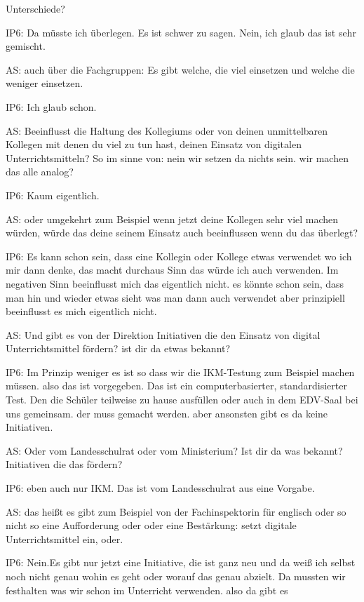 \documentclass[fontsize=11pt,paper=a4]{scrbook}
\begin{document}
{\begin{itemize*}
Unterschiede?
\item[IP6:] Da müsste ich überlegen. Es ist schwer zu sagen. Nein, ich glaub das ist sehr gemischt.
\item[AS:] auch über die Fachgruppen: Es gibt welche, die viel einsetzen und welche die weniger einsetzen.
\item[IP6:] Ich glaub schon.
\item[AS:] Beeinflusst die Haltung des Kollegiums
oder von deinen unmittelbaren Kollegen
mit denen du viel zu tun hast, deinen
Einsatz von digitalen Unterrichtsmitteln? So im sinne
von: nein wir setzen da nichts sein. wir
machen das alle analog?
\item[IP6:] Kaum eigentlich.
\item[AS:] oder umgekehrt zum Beispiel wenn jetzt
deine Kollegen sehr viel machen würden,
würde das deine seinem Einsatz auch
beeinflussen wenn du das überlegt?
\item[IP6:] Es kann schon sein, dass eine Kollegin oder
Kollege etwas verwendet wo ich mir dann denke,
das macht durchaus Sinn
das würde ich auch verwenden. Im negativen Sinn beeinflusst mich
das eigentlich nicht.
es könnte schon sein, dass man hin und wieder
etwas sieht was man dann auch verwendet
aber prinzipiell beeinflusst es mich eigentlich nicht.
\item[AS:] Und gibt es von der Direktion Initiativen die den Einsatz
von digital Unterrichtsmittel fördern?
ist dir da etwas bekannt?
\item[IP6:] Im Prinzip
weniger
es ist so dass wir die IKM-Testung  zum
Beispiel machen müssen. also das ist
vorgegeben. Das ist ein computerbasierter, standardisierter Test. Den die
Schüler teilweise zu hause ausfüllen
oder auch in dem EDV-Saal bei uns
gemeinsam. der muss gemacht werden.
aber ansonsten gibt es da keine Initiativen.
\item[AS:] Oder vom Landesschulrat oder vom Ministerium? Ist dir da was bekannt? Initiativen die das fördern?
\item[IP6:] eben auch nur IKM. Das ist vom
Landesschulrat aus eine Vorgabe.
\item[AS:] das heißt es gibt zum Beispiel von der Fachinspektorin für englisch oder so nicht
so eine Aufforderung oder oder
eine Bestärkung: setzt digitale
Unterrichtsmittel ein, oder.
\item[IP6:] Nein.Es gibt nur jetzt eine Initiative, die ist ganz neu und da weiß ich
selbst noch nicht genau wohin es geht
oder worauf das genau abzielt. Da mussten wir festhalten was wir schon im
Unterricht verwenden.  also da gibt es

\end{itemize*}}
\end{document}
